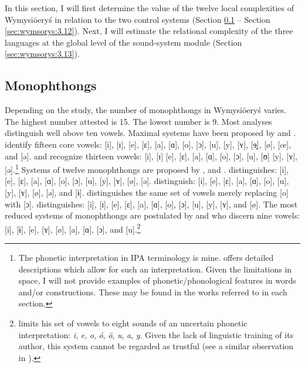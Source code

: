 \documentclass[output=paper,hidelinks]{langscibook}
\begin{document}
In this section, I will first determine the value of the twelve local complexities of Wymysiöeryś in relation to the two control systems (Section \ref{sec:wymsorys:3.1} -- Section \ref{sec:wymsorys:3.12}). Next, I will estimate the relational complexity of the three languages at the global level of the sound-system module (Section \ref{sec:wymsorys:3.13}).

\subsection{Monophthongs}\label{sec:wymsorys:3.1}


Depending on the study, the number of monophthongs in Wymysiöeryś varies. The highest number attested is 15. The lowest number is 9. Most analyses distinguish well above ten vowels. Maximal systems have been proposed by \citet{andrason_grammar_2016, kleczkowski_dialekt_1920} and \citet{mojmir_worterbuch}. \citet[20]{andrason_grammar_2016} identify fifteen core vowels: [i], [ɪ], [e], [ɛ], [a], [ɑ], [o], [ɔ], [u], [y], [ʏ], [ɘ̟], [ø], [œ], and [ə]. \citet[11--12, 171]{kleczkowski_dialekt_1920} and \citet[xii--xiii]{mojmir_worterbuch} recognize thirteen vowels: [i], [ɪ] [e], [ɛ], [a], [ɑ], [o], [ɔ], [u], [ʊ] [y], [ʏ], [ə].\footnote{The phonetic interpretation in IPA terminology is mine. \citet{kleczkowski_dialekt_1920} offers detailed descriptions which allow for such an interpretation. Given the limitations in space, I will not provide examples of phonetic/phonological features in words and/or constructions. These may be found in the works referred to in each section.} Systems of twelve monophthongs are proposed by \citet{lasatowicz_deutsche_1994, zieniukowa_sutuacja_2001, wicherkiewicz_making_2003}, and \citet{andrason_szkic_2014}. \citet[32--41]{lasatowicz_deutsche_1994} distinguishes: [i], [e], [ɛ], [a], [ɑ], [o], [ɔ], [u], [y], [ʏ], [ø], [ə]. \citet[499--500]{zieniukowa_sutuacja_2001} distinguish: [i], [e], [ɛ], [a], [ɑ], [o], [u], [y], [ʏ], [ø], [ə], and [ɨ]. \citet[407]{wicherkiewicz_making_2003} distinguishes the same set of vowels merely replacing [o] with [ɔ]. \citet[126--127]{andrason_szkic_2014} distinguishes: [i], [ɪ], [e], [ɛ], [a], [ɑ], [o], [ɔ], [u], [y], [ʏ], and [ø]. The most reduced systems of monophthongs are postulated by \citet{weckwerth_polands_2015} and \citet{ritchie_considerations_2012} who discern nine vowels: [i], [ɨ], [e], [ʏ], [ø], [a], [ɑ], [ɔ], and [u].\footnote{\citet{lasatowicz_deutsche_1994} limits his set of vowels to eight sounds of an uncertain phonetic interpretation: \textit{i}, \textit{e}, \textit{o}, \textit{ó}, \textit{ö}, \textit{u}, \textit{a}, \textit{y}. Given the lack of linguistic training of its author, this system cannot be regarded as trustful (see a similar observation in \citealt{wicherkiewicz_making_2003}).}
\end{document}
